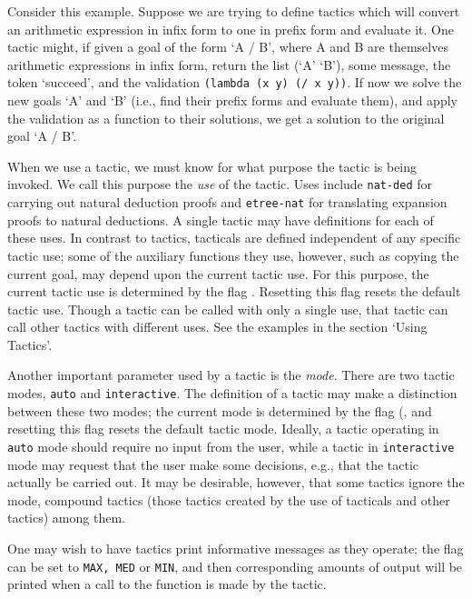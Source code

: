 Consider this example.  Suppose we are trying to define tactics which
will convert an arithmetic expression in infix form to one in
prefix form and evaluate it.  One tactic might,
if given a goal of the form `A / B', where A and B are themselves
arithmetic expressions in infix form, return the list (`A' `B'),
some message, the token `succeed', and the
validation {\tt (lambda (x y) (/ x y))}.  If now we solve the new goals `A'
and `B' (i.e., find their prefix forms and evaluate them),
and apply the validation as a function to their solutions, we get
a solution to the original goal `A / B'.

When we use a tactic, we must know for what purpose the tactic is being
invoked.  We call this purpose the {\it use} of the tactic.  Uses include
{\tt nat-ded} for carrying out natural deduction proofs and
{\tt etree-nat}
for translating expansion proofs to natural deductions.  A single tactic may
have definitions for each of these uses.  In contrast to tactics, tacticals
are defined independent of any specific tactic use; some of the auxiliary
functions they use, however, such as copying the current goal, may depend
upon the current tactic use.  For this purpose, the current tactic use
is determined by the flag .  Resetting this flag resets
the default tactic use. Though a tactic can be called
with only a single use, that tactic can call other tactics with different
uses.  See the examples in the section `Using Tactics'.

Another important parameter used by a tactic is the {\it mode}.  There are
two tactic modes, {\tt auto} and {\tt interactive}.  The definition of
a tactic may make a distinction between these two modes; the current
mode is determined by the flag (, and resetting this
flag resets the default tactic mode.  Ideally, a tactic
operating in {\tt auto} mode should require no input from the user, while
a tactic in {\tt interactive} mode may request that the user make some decisions,
e.g., that the tactic actually be carried out.  It may be desirable, however,
that some tactics ignore the mode, compound tactics (those tactics created
by the use of tacticals and other tactics) among them.

One may wish to have tactics print informative messages as they operate;
the flag  can be set to {\tt MAX, MED} or {\tt MIN},
and then corresponding amounts of output will be printed when a call to
the function  is made by the tactic.


